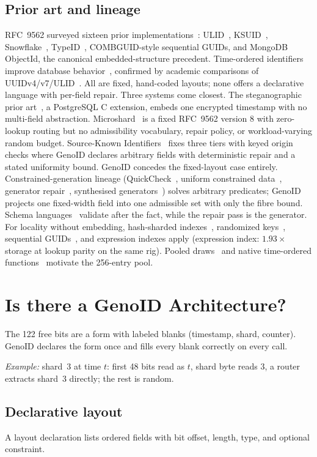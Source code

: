 \documentclass{svproc}
\begin{document}
\subsection{Prior art and lineage}
RFC~9562 surveyed sixteen prior implementations~\cite{4}: ULID~\cite{5}, KSUID~\cite{6}, Snowflake~\cite{7}, TypeID~\cite{8}, COMBGUID-style sequential GUIDs, and MongoDB ObjectId, the canonical embedded-structure precedent. Time-ordered identifiers improve database behavior~\cite{9}, confirmed by academic comparisons of UUIDv4/v7/ULID~\cite{10}. All are fixed, hand-coded layouts; none offers a declarative language with per-field repair. Three systems come closest. The steganographic prior art~\cite{11}, a PostgreSQL C extension, embeds one encrypted timestamp with no multi-field abstraction. Microshard~\cite{14} is a fixed RFC~9562 version 8 with zero-lookup routing but no admissibility vocabulary, repair policy, or workload-varying random budget. Source-Known Identifiers~\cite{26} fixes three tiers with keyed origin checks where GenoID declares arbitrary fields with deterministic repair and a stated uniformity bound. GenoID concedes the fixed-layout case entirely.
Constrained-generation lineage (QuickCheck~\cite{15}, uniform constrained data~\cite{16}, generator repair~\cite{17}, synthesised generators~\cite{18}) solves arbitrary predicates; GenoID projects one fixed-width field into one admissible set with only the fibre bound. Schema languages~\cite{25} validate after the fact, while the repair pass is the generator. For locality without embedding, hash-sharded indexes~\cite{19}, randomized keys~\cite{20}, sequential GUIDs~\cite{21}, and expression indexes apply (expression index: $1.93\times$ storage at lookup parity on the same rig). Pooled draws~\cite{12} and native time-ordered functions~\cite{13} motivate the 256-entry pool.

\section{Is there a GenoID Architecture?}
\label{sec:design}
The 122 free bits are a form with labeled blanks (timestamp, shard, counter). GenoID declares the form once and fills every blank correctly on every call.

\medskip
\noindent\emph{Example:} shard~3 at time $t$: first 48 bits read as $t$, shard byte reads 3, a router extracts shard~3 directly; the rest is random.

\subsection{Declarative layout}
\label{sec:layout}
A layout declaration lists ordered fields with bit offset, length, type, and optional constraint.
\end{document}
